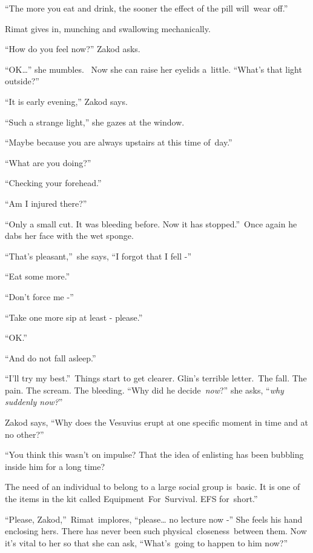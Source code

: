 \documentclass[letterpaper]{article}
\begin{document}
{}``The more you eat and drink, the sooner the effect of the pill will\ wear off.''

Rimat gives in, munching and swallowing mechanically.

{}``How do you feel now?'' Zakod asks. \ 

{}``OK{\dots}'' she mumbles.~ Now she can raise her eyelids a\ little. ``What{}'s that light outside?''\ 

{}``It is early evening,'' Zakod says.\ 

{}``Such a strange light,'' she gazes at the window.\ 

{}``Maybe because you are always upstairs at this time of~day.''\ 

{}``What are you doing?''\ 

{}``Checking your forehead.''\ 

{}``Am I injured there?''\ 

{}``Only a small cut. It was bleeding before. Now it has stopped.''\ Once again he dabs her face with the wet sponge. 

{}``That's pleasant,''\ she says, ``I forgot that I fell -''\ 

{}``Eat some more.{}''

{}``Don't force me -{}''\ 

{}``Take one more sip at least - please.''\ 

{}``OK.{}''\ 

{}``And do not fall asleep.''

{}``I{}'ll try my best.{}''\ Things start to get clearer. Glin{}'s terrible letter.\ The fall. The pain. The scream. The
bleeding. {}``Why did he decide\ \textit{now}?{}'' she asks, ``\textit{why suddenly now?}{}''

Zakod says, ``Why does the Vesuvius erupt at one specific moment in time and at no other?''\ 

{}``You think this wasn't on impulse? That the idea of enlisting has been bubbling inside him for a long
time?{\textquotedbl} 

{\textquotedbl}The need of an individual to belong to a large social group is\ basic. It is one of the items in the kit
called Equipment\ For\ Survival. EFS for\ short.''\ 

{}``Please, Zakod,''\ Rimat~implores, ``please{\dots} no lecture now -'' She feels his hand enclosing hers. There has
never been such physical\ closeness\textcolor{red}{\ }between them. Now it{}'s vital to her so that she can ask,
``What's\ going to happen to him now?''\ 
\end{document}
